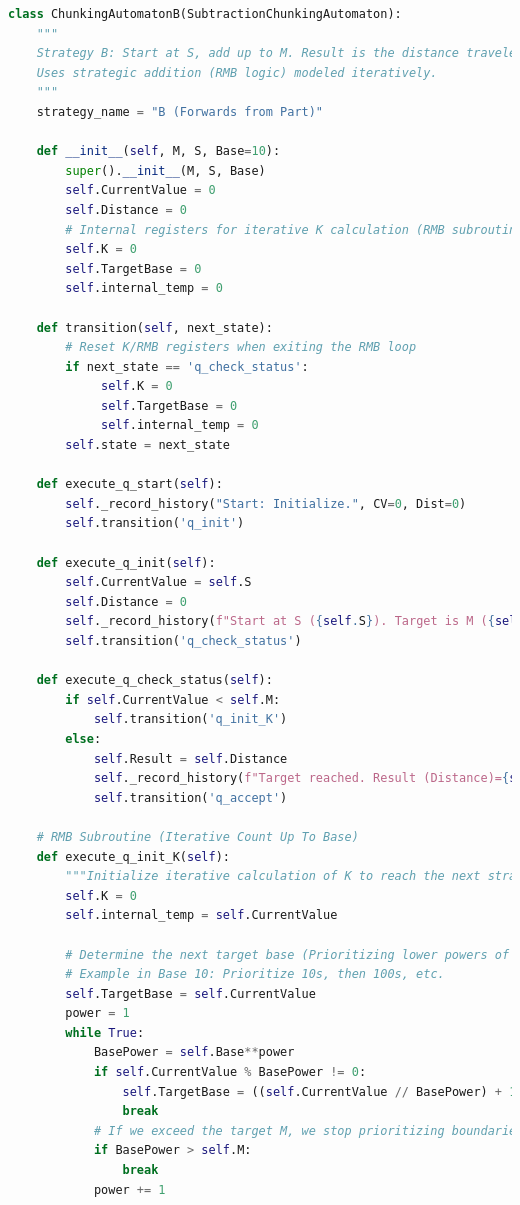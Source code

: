 \documentclass[11pt]{article}
\begin{document}
\begin{lstlisting}[language=Python]
class ChunkingAutomatonB(SubtractionChunkingAutomaton):
    """
    Strategy B: Start at S, add up to M. Result is the distance traveled.
    Uses strategic addition (RMB logic) modeled iteratively.
    """
    strategy_name = "B (Forwards from Part)"

    def __init__(self, M, S, Base=10):
        super().__init__(M, S, Base)
        self.CurrentValue = 0
        self.Distance = 0
        # Internal registers for iterative K calculation (RMB subroutine)
        self.K = 0
        self.TargetBase = 0
        self.internal_temp = 0

    def transition(self, next_state):
        # Reset K/RMB registers when exiting the RMB loop
        if next_state == 'q_check_status':
             self.K = 0
             self.TargetBase = 0
             self.internal_temp = 0
        self.state = next_state

    def execute_q_start(self):
        self._record_history("Start: Initialize.", CV=0, Dist=0)
        self.transition('q_init')

    def execute_q_init(self):
        self.CurrentValue = self.S
        self.Distance = 0
        self._record_history(f"Start at S ({self.S}). Target is M ({self.M}).", CV=self.CurrentValue, Dist=self.Distance)
        self.transition('q_check_status')

    def execute_q_check_status(self):
        if self.CurrentValue < self.M:
            self.transition('q_init_K')
        else:
            self.Result = self.Distance
            self._record_history(f"Target reached. Result (Distance)={self.Result}.", CV=self.CurrentValue, Dist=self.Distance)
            self.transition('q_accept')

    # RMB Subroutine (Iterative Count Up To Base)
    def execute_q_init_K(self):
        """Initialize iterative calculation of K to reach the next strategic base."""
        self.K = 0
        self.internal_temp = self.CurrentValue

        # Determine the next target base (Prioritizing lower powers of the base)
        # Example in Base 10: Prioritize 10s, then 100s, etc.
        self.TargetBase = self.CurrentValue
        power = 1
        while True:
            BasePower = self.Base**power
            if self.CurrentValue % BasePower != 0:
                self.TargetBase = ((self.CurrentValue // BasePower) + 1) * BasePower
                break
            # If we exceed the target M, we stop prioritizing boundaries.
            if BasePower > self.M:
                break
            power += 1


\end{lstlisting}
\end{document}
